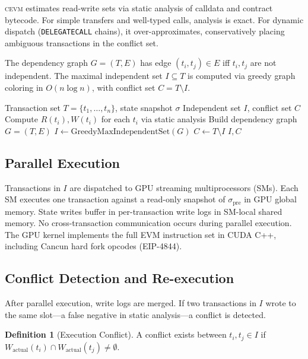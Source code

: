 \documentclass[11pt,letterpaper]{article}
\theoremstyle{definition}
\newtheorem{definition}{Definition}
\theoremstyle{remark}
\newcommand{\cevm}{\textsc{cevm}}
\begin{document}
\cevm{} estimates read-write sets via static analysis of calldata and contract bytecode.
For simple transfers and well-typed calls, analysis is exact.
For dynamic dispatch (\texttt{DELEGATECALL} chains), it over-approximates, conservatively placing ambiguous transactions in the conflict set.

The dependency graph $G = (T, E)$ has edge $(t_i, t_j) \in E$ iff $t_i, t_j$ are not independent.
The maximal independent set $I \subseteq T$ is computed via greedy graph coloring in $O(n \log n)$, with conflict set $C = T \setminus I$.

\begin{algorithm}
\caption{Transaction Partitioning}
\label{alg:partition}
\begin{algorithmic}[1]
\REQUIRE Transaction set $T = \{t_1, \ldots, t_n\}$, state snapshot $\sigma$
\ENSURE Independent set $I$, conflict set $C$
\STATE Compute $R(t_i), W(t_i)$ for each $t_i$ via static analysis
\STATE Build dependency graph $G = (T, E)$
\STATE $I \gets \text{GreedyMaxIndependentSet}(G)$
\STATE $C \gets T \setminus I$
\RETURN $I, C$
\end{algorithmic}
\end{algorithm}

\subsection{Parallel Execution}

Transactions in $I$ are dispatched to GPU streaming multiprocessors (SMs).
Each SM executes one transaction against a read-only snapshot of $\sigma_{\text{pre}}$ in GPU global memory.
State writes buffer in per-transaction write logs in SM-local shared memory.
No cross-transaction communication occurs during parallel execution.
The GPU kernel implements the full EVM instruction set in CUDA C++, including Cancun hard fork opcodes (EIP-4844).

\subsection{Conflict Detection and Re-execution}

After parallel execution, write logs are merged.
If two transactions in $I$ wrote to the same slot---a false negative in static analysis---a conflict is detected.

\begin{definition}[Execution Conflict]
A conflict exists between $t_i, t_j \in I$ if $W_{\text{actual}}(t_i) \cap W_{\text{actual}}(t_j) \neq \emptyset$.
\end{definition}
\end{document}
